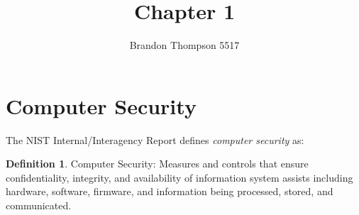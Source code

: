 \documentclass[a4paper]{article}
\theoremstyle{definition}
\newtheorem{definition}{Definition}[section]
\theoremstyle{remark}
\begin{document}
	\title{Chapter 1}
	\author{Brandon Thompson 5517}
	\maketitle

	\section{Computer Security}
	The NIST Internal/Interagency Report defines \textit{computer security} as:
	
	\begin{definition}{Computer Security:}
		Measures and controls that ensure confidentiality, integrity, and availability of
        	information system assists including hardware, software, firmware, and information
        	being processed, stored, and communicated.
	\end{definition}
\end{document}
